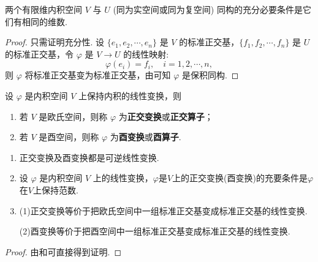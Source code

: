 \documentclass[../../main.tex]{subfiles}%
\begin{document}
\begin{corollary}\label{corollary:有限维内积空间同构的充要条件}
两个有限维内积空间 $V$ 与 $U$ (同为实空间或同为复空间) 同构的充分必要条件是它们有相同的维数.
\end{corollary}
\begin{proof}

只需证明充分性. 设 $\{e_1,e_2,\cdots,e_n\}$ 是 $V$ 的标准正交基，$\{f_1,f_2,\cdots,f_n\}$ 是 $U$ 的标准正交基，令 $\varphi$ 是 $V \to U$ 的线性映射:
\[
\varphi(e_i) = f_i,\quad i = 1,2,\cdots,n,
\]
则 $\varphi$ 将标准正交基变为标准正交基，由可知 $\varphi$ 是保积同构.

\end{proof}

\begin{definition}
设 $\varphi$ 是内积空间 $V$ 上保持内积的线性变换，则
\begin{enumerate}
\item 若 $V$ 是欧氏空间，则称 $\varphi$ 为\textbf{正交变换}或\textbf{正交算子}；

\item 若 $V$ 是酉空间，则称 $\varphi$ 为\textbf{酉变换}或\textbf{酉算子}.
\end{enumerate}
\end{definition}

\begin{theorem}\label{theorem:正交变换和酉变换的基本性质}
\begin{enumerate}
\item 正交变换及酉变换都是可逆线性变换.

\item 设 $\varphi$ 是内积空间 $V$ 上的线性变换，$\varphi$是$V$上的正交变换(酉变换)的充要条件是$\varphi$在$V$上保持范数.

\item (1)正交变换等价于把欧氏空间中一组标准正交基变成标准正交基的线性变换.

(2)酉变换等价于把酉空间中一组标准正交基变成标准正交基的线性变换.
\end{enumerate}
\end{theorem}
\begin{proof}

由和可直接得到证明.

\end{proof}
\end{document}
